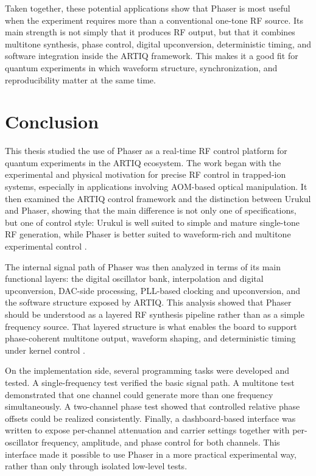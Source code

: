 Taken together, these potential applications show that Phaser is most useful when the experiment requires more than a conventional one-tone RF source. Its main strength is not simply that it produces RF output, but that it combines multitone synthesis, phase control, digital upconversion, deterministic timing, and software integration inside the ARTIQ framework. This makes it a good fit for quantum experiments in which waveform structure, synchronization, and reproducibility matter at the same time.

\section{Conclusion}

This thesis studied the use of Phaser as a real-time RF control platform for quantum experiments in the ARTIQ ecosystem. The work began with the experimental and physical motivation for precise RF control in trapped-ion systems, especially in applications involving AOM-based optical manipulation. It then examined the ARTIQ control framework and the distinction between Urukul and Phaser, showing that the main difference is not only one of specifications, but one of control style: Urukul is well suited to simple and mature single-tone RF generation, while Phaser is better suited to waveform-rich and multitone experimental control \cite{artiq_rtio, urukul_datasheet, phaser_datasheet}.

The internal signal path of Phaser was then analyzed in terms of its main functional layers: the digital oscillator bank, interpolation and digital upconversion, DAC-side processing, PLL-based clocking and upconversion, and the software structure exposed by ARTIQ. This analysis showed that Phaser should be understood as a layered RF synthesis pipeline rather than as a simple frequency source. That layered structure is what enables the board to support phase-coherent multitone output, waveform shaping, and deterministic timing under kernel control \cite{artiq_coredrivers, artiq_phaser_module, dac34h84, trf372017}.

On the implementation side, several programming tasks were developed and tested. A single-frequency test verified the basic signal path. A multitone test demonstrated that one channel could generate more than one frequency simultaneously. A two-channel phase test showed that controlled relative phase offsets could be realized consistently. Finally, a dashboard-based interface was written to expose per-channel attenuation and carrier settings together with per-oscillator frequency, amplitude, and phase control for both channels. This interface made it possible to use Phaser in a more practical experimental way, rather than only through isolated low-level tests.

